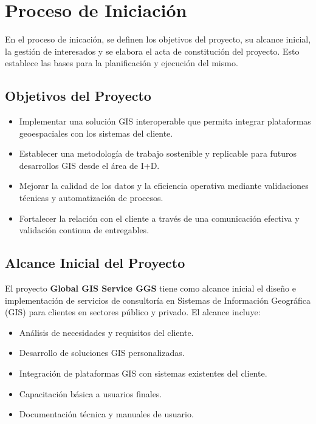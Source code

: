 \section{Proceso de Iniciación}

En el proceso de inicación, se definen los objetivos del proyecto, su alcance inicial, la gestión de interesados y se elabora el acta de constitución del proyecto. Esto establece las bases para la planificación y ejecución del mismo.

\subsection{Objetivos del Proyecto}
\begin{itemize}
    \item Implementar una solución GIS interoperable que permita integrar plataformas geoespaciales con los sistemas del cliente.
    \item Establecer una metodología de trabajo sostenible y replicable para futuros desarrollos GIS desde el área de I+D.
    \item Mejorar la calidad de los datos y la eficiencia operativa mediante validaciones técnicas y automatización de procesos.
    \item Fortalecer la relación con el cliente a través de una comunicación efectiva y validación continua de entregables.
\end{itemize}

\subsection{Alcance Inicial del Proyecto}

El proyecto \textbf{Global GIS Service GGS} tiene como alcance inicial el diseño e implementación de servicios de consultoría en Sistemas de Información Geográfica (GIS) para clientes en sectores público y privado. El alcance incluye:
\begin{itemize}
    \item Análisis de necesidades y requisitos del cliente.
    \item Desarrollo de soluciones GIS personalizadas.
    \item Integración de plataformas GIS con sistemas existentes del cliente.
    \item Capacitación básica a usuarios finales.
    \item Documentación técnica y manuales de usuario.
\end{itemize}

